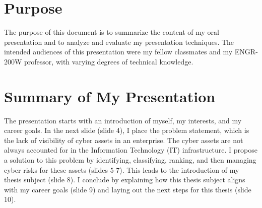 \documentclass[letterpaper,12pt]{article}
\begin{document}
\begin{singlespacing}



\section*{Purpose}
The purpose of this document is to summarize the content of my oral presentation and to analyze and evaluate my presentation techniques. The intended audiences of this presentation were my fellow classmates and my ENGR-200W professor, with varying degrees of technical knowledge.


\section*{Summary of My Presentation}
The presentation starts with an introduction of myself, my interests, and my career goals. In the next slide (slide 4), I place the problem statement, which is the lack of visibility of cyber assets in an enterprise. The cyber assets are not always accounted for in the Information Technology (IT) infrastructure. I propose a solution to this problem by identifying, classifying, ranking, and then managing cyber risks for these assets (slides 5-7). This leads to the introduction of my thesis subject  (slide 8). I conclude by explaining how this thesis subject aligns with my career goals (slide 9) and laying out the next steps for this thesis (slide 10).


\end{singlespacing}
\end{document}
